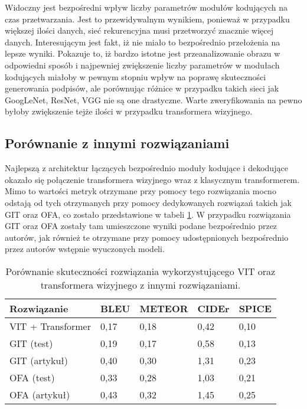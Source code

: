 \noindent Widoczny jest bezpośredni wpływ liczby parametrów modułów kodujących na czas przetwarzania. Jest to przewidywalnym wynikiem, ponieważ w przypadku większej ilości danych, sieć rekurencyjna musi przetworzyć znacznie więcej danych. Interesującym jest fakt, iż nie miało to bezpośrednio przełożenia na lepsze wyniki. Pokazuje to, iż bardzo istotne jest przeanalizowanie obrazu w odpowiedni sposób i najpewniej zwiększenie liczby parametrów w modułach kodujących miałoby w pewnym stopniu wpływ na poprawę skuteczności generowania podpisów, ale porównując różnice w przypadku takich sieci jak GoogLeNet, ResNet, VGG nie są one drastyczne. Warte zweryfikowania na pewno byłoby zwiększenie tejże ilości w przypadku transformera wizyjnego.
\subsection{Porównanie z innymi rozwiązaniami}
Najlepszą z architektur łączących bezpośrednio moduły kodujące i dekodujące okazało się połączenie transformera wizyjnego wraz z klasycznym transformerem. Mimo to wartości metryk otrzymane przy pomocy tego rozwiązania mocno odstają od tych otrzymanych przy pomocy dedykowanych rozwiązań takich jak GIT oraz OFA, co zostało przedstawione w tabeli \ref{tab:comparison}. W przypadku rozwiązania GIT oraz OFA zostały tam umieszczone wyniki podane bezpośrednio przez autorów, jak również te otrzymane przy pomocy udostępnionych bezpośrednio przez autorów wstępnie wyuczonych modeli.
\begin{table}[H]
    \centering
    \caption{Porównanie skuteczności rozwiązania wykorzystującego VIT oraz transformera wizyjnego z innymi rozwiązaniami.}
    \label{tab:comparison}
    \begin{tabular}{|l|l|l|l|l|}
        \hline
        \textbf{Rozwiązanie} & \textbf{BLEU} & \textbf{METEOR} & \textbf{CIDEr} & \textbf{SPICE} \\ \hline
        VIT + Transformer    & 0,17          & 0,18            & 0,42           & 0,10           \\ \hline
        GIT (test)           & 0,19          & 0,17            & 0,58           & 0,13           \\ \hline
        GIT (artykuł)        & 0,40          & 0,30            & 1,31           & 0,23           \\ \hline
        OFA (test)           & 0,33          & 0,28            & 1,03           & 0,21           \\ \hline
        OFA  (artykuł)       & 0,43          & 0,32            & 1,45           & 0,25           \\ \hline
    \end{tabular}
\end{table}
